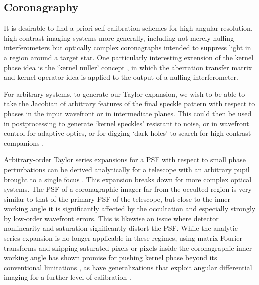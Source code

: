 \documentclass[modern]{aastex63}
\begin{document}

\subsection{Coronagraphy}
\label{sec:coronagraph}

It is desirable to find a priori self-calibration schemes for high-angular-resolution, high-contrast imaging systems more generally, including not merely nulling interferometers but optically complex coronagraphs intended to suppress light in a region around a target star. One particularly interesting extension of the kernel phase idea is the `kernel nuller' concept \citep{martinache18}, in which the aberration transfer matrix and kernel operator idea is applied to the output of a nulling interferometer. 

For arbitrary systems, to generate our Taylor expansion, we wish to be able to take the Jacobian of arbitrary features of the final speckle pattern with respect to phases in the input wavefront or in intermediate planes. This could then be used in postprocessing to generate `kernel speckles' resistant to noise, or in wavefront control for adaptive optics, or for digging `dark holes' to search for high contrast companions \citep{malbet95}.

Arbitrary-order Taylor series expansions for a PSF with respect to small phase perturbations can be derived analytically for a telescope with an arbitrary pupil brought to a single focus \citep{bloemhof01,anand02,perrin03}. This expansion breaks down for more complex optical systems. The PSF of a coronagraphic imager far from the occulted region is very similar to that of the primary PSF of the telescope, but close to the inner working angle it is significantly affected by the occultation and especially strongly by low-order wavefront errors. This is likewise an issue where detector nonlinearity and saturation significantly distort the PSF. While the analytic series expansion is no longer applicable in these regimes, using matrix Fourier transforms and skipping saturated pixels or pixels inside the coronagraphic inner working angle has shown promise for pushing kernel phase beyond its conventional limitations \citep{laugier19b}, as have generalizations that exploit angular differential imaging for a further level of calibration \citep{laugier20}.
\end{document}

